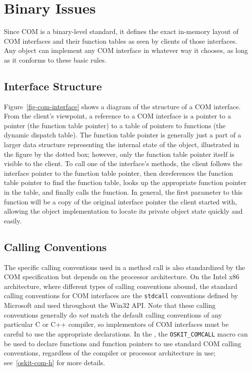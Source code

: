 
\section{Binary Issues}

Since COM is a binary-level standard,
it defines the exact in-memory layout
of COM interfaces and their function tables
as seen by clients of those interfaces.
Any object can implement any COM interface in whatever way it chooses,
as long as it conforms to these basic rules.

\subsection{Interface Structure}


Figure~\ref{fig-com-interface} shows a diagram
of the structure of a COM interface.
From the client's viewpoint,
a reference to a COM interface
is a pointer to a pointer (the function table pointer)
to a table of pointers to functions (the dynamic dispatch table).
The function table pointer
is generally just a part of a larger data structure
representing the internal state of the object,
illustrated in the figure by the dotted box;
however, only the function table pointer itself is visible to the client.
To call one of the interface's methods,
the client follows the interface pointer to the function table pointer,
then dereferences the function table pointer to find the function table,
looks up the appropriate function pointer in the table,
and finally calls the function.
In general, the first parameter to this function
will be a copy of the original interface pointer the client started with,
allowing the object implementation
to locate its private object state quickly and easily.

\subsection{Calling Conventions}

The specific calling conventions used in a method call
is also standardized by the COM specification
but depends on the processor architecture.
On the Intel x86 architecture,
where different types of calling conventions abound,
the standard calling conventions for COM interfaces
are the \texttt{stdcall} conventions defined by Microsoft
and used throughout the Win32 API\@.
Note that these calling conventions
generally do \emph{not} match
the default calling conventions of any particular C or C++ compiler,
so implementors of COM interfaces
must be careful to use the appropriate declarations.
In the \oskit{},
the \texttt{OSKIT_COMCALL} macro can be used
to declare functions and function pointers
to use standard COM calling conventions,
regardless of the compiler or processor architecture in use;
see~\ref{oskit-com-h} for more details.

